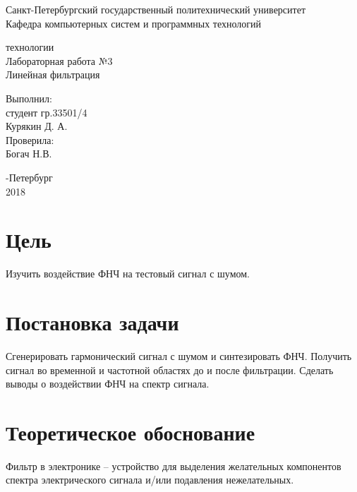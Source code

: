 \documentclass[a4paper,12pt]{article}
\begin{document}
\begin{center}
Санкт-Петербургский государственный политехнический университет
\\Кафедра компьютерных систем и программных технологий
\end{center}
\vspace*{10em plus .6em minus .5em}

\begin{center}
{ технологии
\\Лабораторная работа №3
\\Линейная фильтрация}
\end{center}

\vspace*{5em plus .6em minus .5em}
\begin{flushright}
Выполнил:\\студент гр.33501/4\\Курякин Д. А.\\Проверила:\\Богач Н.В.
\end{flushright}

\vspace*{15em plus .6em minus .5em}
\begin{center}
{-Петербург
\\2018}
\end{center}
\pagestyle{empty}
\newpage
\pagestyle{plain}

\section{Цель}

Изучить воздействие ФНЧ на тестовый сигнал с шумом.

\section{Постановка задачи}

Сгенерировать гармонический сигнал с шумом и синтезировать ФНЧ. Получить сигнал во временной и частотной областях до и после фильтрации. Сделать выводы о воздействии ФНЧ на спектр сигнала.

\section{Теоретическое обоснование}

Фильтр в электронике -- устройство для выделения желательных компонентов спектра электрического сигнала и/или подавления нежелательных.
\end{document}
